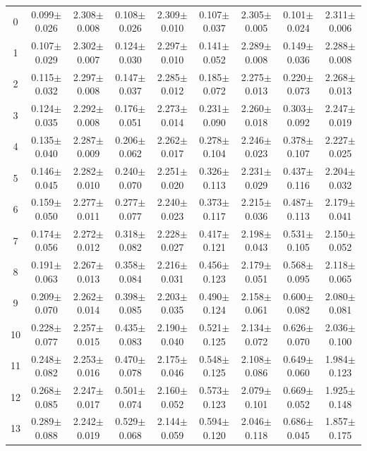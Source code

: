 \begin{table}[H]
{\begin{tabular}{c cc cc cc cc}
0 & 0.099$\pm$0.026 & 2.308$\pm$0.008 & 0.108$\pm$0.026 & 2.309$\pm$0.010 & 0.107$\pm$0.037 & 2.305$\pm$0.005 & 0.101$\pm$0.024 & 2.311$\pm$0.006 \\
1 & 0.107$\pm$0.029 & 2.302$\pm$0.007 & 0.124$\pm$0.030 & 2.297$\pm$0.010 & 0.141$\pm$0.052 & 2.289$\pm$0.008 & 0.149$\pm$0.036 & 2.288$\pm$0.008 \\
2 & 0.115$\pm$0.032 & 2.297$\pm$0.008 & 0.147$\pm$0.037 & 2.285$\pm$0.012 & 0.185$\pm$0.072 & 2.275$\pm$0.013 & 0.220$\pm$0.073 & 2.268$\pm$0.013 \\
3 & 0.124$\pm$0.035 & 2.292$\pm$0.008 & 0.176$\pm$0.051 & 2.273$\pm$0.014 & 0.231$\pm$0.090 & 2.260$\pm$0.018 & 0.303$\pm$0.092 & 2.247$\pm$0.019 \\
4 & 0.135$\pm$0.040 & 2.287$\pm$0.009 & 0.206$\pm$0.062 & 2.262$\pm$0.017 & 0.278$\pm$0.104 & 2.246$\pm$0.023 & 0.378$\pm$0.107 & 2.227$\pm$0.025 \\
5 & 0.146$\pm$0.045 & 2.282$\pm$0.010 & 0.240$\pm$0.070 & 2.251$\pm$0.020 & 0.326$\pm$0.113 & 2.231$\pm$0.029 & 0.437$\pm$0.116 & 2.204$\pm$0.032 \\
6 & 0.159$\pm$0.050 & 2.277$\pm$0.011 & 0.277$\pm$0.077 & 2.240$\pm$0.023 & 0.373$\pm$0.117 & 2.215$\pm$0.036 & 0.487$\pm$0.113 & 2.179$\pm$0.041 \\
7 & 0.174$\pm$0.056 & 2.272$\pm$0.012 & 0.318$\pm$0.082 & 2.228$\pm$0.027 & 0.417$\pm$0.121 & 2.198$\pm$0.043 & 0.531$\pm$0.105 & 2.150$\pm$0.052 \\
8 & 0.191$\pm$0.063 & 2.267$\pm$0.013 & 0.358$\pm$0.084 & 2.216$\pm$0.031 & 0.456$\pm$0.123 & 2.179$\pm$0.051 & 0.568$\pm$0.095 & 2.118$\pm$0.065 \\
9 & 0.209$\pm$0.070 & 2.262$\pm$0.014 & 0.398$\pm$0.085 & 2.203$\pm$0.035 & 0.490$\pm$0.124 & 2.158$\pm$0.061 & 0.600$\pm$0.082 & 2.080$\pm$0.081 \\
10 & 0.228$\pm$0.077 & 2.257$\pm$0.015 & 0.435$\pm$0.083 & 2.190$\pm$0.040 & 0.521$\pm$0.125 & 2.134$\pm$0.072 & 0.626$\pm$0.070 & 2.036$\pm$0.100 \\
11 & 0.248$\pm$0.082 & 2.253$\pm$0.016 & 0.470$\pm$0.078 & 2.175$\pm$0.046 & 0.548$\pm$0.125 & 2.108$\pm$0.086 & 0.649$\pm$0.060 & 1.984$\pm$0.123 \\
12 & 0.268$\pm$0.085 & 2.247$\pm$0.017 & 0.501$\pm$0.074 & 2.160$\pm$0.052 & 0.573$\pm$0.123 & 2.079$\pm$0.101 & 0.669$\pm$0.052 & 1.925$\pm$0.148 \\
13 & 0.289$\pm$0.088 & 2.242$\pm$0.019 & 0.529$\pm$0.068 & 2.144$\pm$0.059 & 0.594$\pm$0.120 & 2.046$\pm$0.118 & 0.686$\pm$0.045 & 1.857$\pm$0.175 \\

\end{tabular}}
\end{table}
